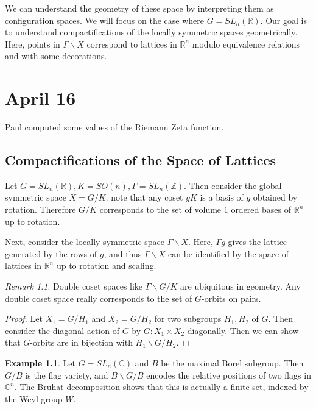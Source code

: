 \documentclass[leqno, openany]{memoir}
\theoremstyle{definition}
\newtheorem{exm}[thm]{Example}
\theoremstyle{remark}
\newtheorem{rmk}[thm]{Remark}
\theoremstyle{plain}
\theoremstyle{definition}
\theoremstyle{remark}
\newcommand{\R}{\mathbb{R}}
\newcommand{\C}{\mathbb{C}}
\newcommand{\Z}{\mathbb{Z}}
\begin{document}
We can understand the geometry of these space by interpreting them as configuration spaces. We will focus on the case where $G = SL_n(\R)$. Our goal is to understand compactifications of the locally symmetric spaces geometrically. Here, points in $\Gamma \backslash X$ correspond to lattices in $\R^n$ modulo equivalence relations and with some decorations.

\chapter{April 16}%
\label{cha:april_16}

Paul computed some values of the Riemann Zeta function.

\section{Compactifications of the Space of Lattices}%
\label{sec:compactifications_of_the_space_of_lattices}

Let $G = SL_n(\R), K = SO(n), \Gamma = SL_n(\Z)$. Then consider the global symmetric space $X = G/K$. note that any coset $gK$ is a basis of $g$ obtained by rotation. Therefore $G/K$ corresponds to the set of volume $1$ ordered bases of $\R^n$ up to rotation. 

Next, consider the locally symmetric space $\Gamma \backslash X$. Here, $\Gamma g$ gives the lattice generated by the rows of $g$, and thus $\Gamma \backslash X$ can be identified by the space of lattices in $\R^n$ up to rotation and scaling.

\begin{rmk}
    Double coset spaces like $\Gamma \backslash G / K$ are ubiquitous in geometry. Any double coset space really corresponds to the set of $G$-orbits on pairs.
\end{rmk}

\begin{proof}
    Let $X_1 = G/H_1$ and $X_2 = G/H_2$ for two subgroups $H_1,H_2$ of $G$. Then consider the diagonal action of $G$ by $G: X_1 \times X_2$ diagonally. Then we can show that $G$-orbits are in bijection with $H_1 \backslash G / H_2$.
\end{proof}

\begin{exm}
    Let $G = SL_n(\C)$ and $B$ be the maximal Borel subgroup. Then $G/B$ is the flag variety, and $B \backslash G / B$ encodes the relative positions of two flags in $\C^n$. The Bruhat decomposition shows that this is actually a finite set, indexed by the Weyl group $W$.
\end{exm}
\end{document}
